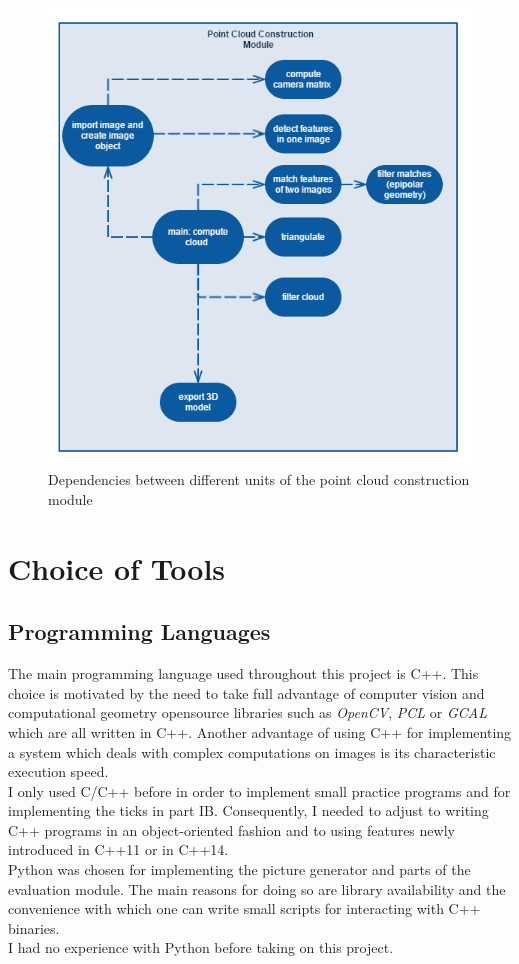 \documentclass[12pt,a4paper,twoside,openright]{report}
\begin{document}
\begin{figure}
\centerline{\includegraphics[scale=0.75]{figs/dependencies.png}}
\caption{Dependencies between different units of the point cloud construction module}
\end{figure}


\section{Choice of Tools}

\subsection{Programming Languages}
The main programming language used throughout this project is C++. This choice is motivated by the need to take full advantage of computer vision and computational geometry opensource libraries such as \emph{OpenCV}, \emph{PCL} or \emph{GCAL} which are all written in C++. Another advantage of using C++ for implementing a system which deals with complex computations on images is its characteristic execution speed.\\
I only used C/C++ before in order to implement small practice programs and for implementing the ticks in part IB. Consequently, I needed to adjust to writing C++ programs in an object-oriented fashion and to using features newly introduced in C++11 or in C++14.\\
\linebreak
Python was chosen for implementing the picture generator and parts of the evaluation module. The main reasons for doing so are library availability and the convenience with which one can write small scripts for interacting with C++ binaries.\\
I had no experience with Python before taking on this project.   
\end{document}
